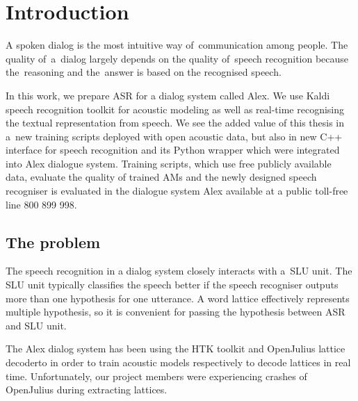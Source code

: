 \chapter{Introduction}
\label{chap:intro}

A spoken dialog is the most intuitive way of~communication among people. 
The quality of~a~dialog largely depends on the quality of~speech recognition because the~reasoning and the~answer is based on the recognised speech. 

In this work, we prepare \acl{ASR} for a dialog system called Alex. 
We use Kaldi speech recognition toolkit\cite{povey2011kaldi} for acoustic modeling as well as real-time recognising the textual representation from speech.
We see the added value of this thesis in a~new training scripts deployed with open acoustic data\cite{korvas_2014}, but also in new C++ interface for speech recognition and its Python wrapper which were integrated into Alex dialogue system. Training scripts, which use free publicly available data, evaluate the quality of trained \aclp{AM} and the newly designed speech recogniser is evaluated in the dialogue system Alex available at a public toll-free line 800 899 998. 


\section{The problem} 
\label{sec:problem}

The speech recognition in a dialog system closely interacts with a~\acl{SLU} unit.
The \ac{SLU} unit typically classifies the speech better if the speech recogniser outputs more than one hypothesis for one utterance. 
A word lattice effectively represents multiple hypothesis, so it is convenient for passing the hypothesis between \ac{ASR} and \ac{SLU} unit.

The Alex dialog system has been using the \ac{HTK} toolkit\cite{young94htk} and OpenJulius\cite{lee2009julius} lattice decoderto in order to train acoustic models respectively to decode lattices in real time. 
Unfortunately, our project members were experiencing crashes of OpenJulius during extracting lattices.

